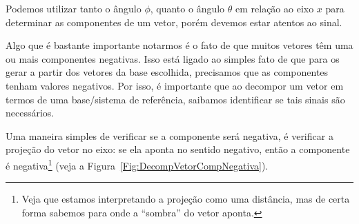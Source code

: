 \begin{marginfigure}
\centering
{}
\caption{Podemos utilizar tanto o ângulo $\phi$, quanto o ângulo $\theta$ em relação ao eixo $x$ para determinar as componentes de um vetor, porém devemos estar atentos ao sinal. \label{Fig:DecompVetorCompNegativa}}
\end{marginfigure}

Algo que é bastante importante notarmos é o fato de que muitos vetores têm uma ou mais componentes negativas. Isso está ligado ao simples fato de que para os gerar a partir dos vetores da base escolhida, precisamos que as componentes tenham valores negativos. Por isso, é importante que ao decompor um vetor em termos de uma base/sistema de referência, saibamos identificar se tais sinais são necessários.

Uma maneira simples de verificar se a componente será negativa, é verificar a projeção do vetor no eixo: se ela aponta no sentido negativo, então a componente é negativa\footnote{Veja que estamos interpretando a projeção como uma distância, mas de certa forma sabemos para onde a ``sombra'' do vetor aponta.} (veja a Figura~\ref{Fig:DecompVetorCompNegativa}).


